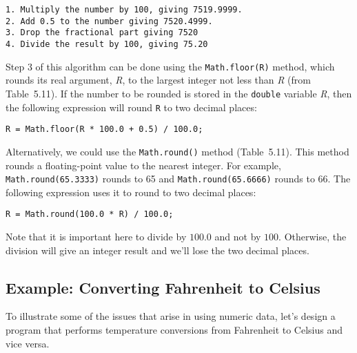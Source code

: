 \begin{jjjlisting}
\begin{lstlisting}
1. Multiply the number by 100, giving 7519.9999.
2. Add 0.5 to the number giving 7520.4999.
3. Drop the fractional part giving 7520
4. Divide the result by 100, giving 75.20
\end{lstlisting}
\end{jjjlisting}

\noindent Step 3 of this algorithm can be done using the
{\tt Math.floor(R)} method, which rounds its real argument, {\em R},
to the largest integer not less than {\em R} (from Table~5.11). If the
number to be rounded is stored in the {\tt double} variable {\it R},
then the following expression will round {\tt R} to two decimal
places:

\begin{jjjlisting}
\begin{lstlisting}
R = Math.floor(R * 100.0 + 0.5) / 100.0;
\end{lstlisting}
\end{jjjlisting}

\noindent Alternatively, we could use the {\tt Math.round()} method
(Table~5.11). This method rounds a floating-point
value to the nearest integer. For example, {\tt Math.round(65.3333)}
rounds to 65 and {\tt Math.round(65.6666)} rounds to 66. The
following expression uses it to round to two decimal places:

\begin{jjjlisting}
\begin{lstlisting}
R = Math.round(100.0 * R) / 100.0;
\end{lstlisting}
\end{jjjlisting}

\noindent Note that it is important here to divide by $100.0$ and
not by $100$. Otherwise, the division will give an integer result and
we'll lose the two decimal places.


\subsection{Example: Converting Fahrenheit to Celsius}
\noindent To illustrate some of the issues that arise in using numeric
data, let's design a program that performs temperature conversions
from Fahrenheit to Celsius and vice versa.


